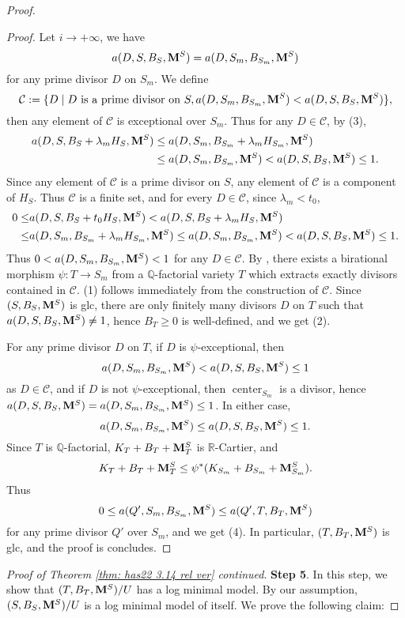 \documentclass[11pt]{amsart}
\numberwithin{equation}{section}
\newcommand{\Mm}{{\bf{M}}}
\newcommand{\Qq}{\mathbb{Q}}
\newcommand{\Rr}{\mathbb{R}}
\newcommand{\Center}{\operatorname{center}}
\theoremstyle{definition}
\theoremstyle{definition}
\theoremstyle{definition}
\begin{document}
\begin{proof}
\begin{proof}
Let $i\rightarrow+\infty$, we have
$$a(D,S,B_S,\Mm^S)=a(D,S_m,B_{S_m},\Mm^S)$$
for any prime divisor $D$ on $S_m$. We define
$$\mathcal{C}:=\{D\mid D\text{ is a prime divisor on }S, a(D,S_m,B_{S_m},\Mm^S)<a(D,S,B_S,\Mm^S)\},$$
then any element of $\mathcal{C}$ is exceptional over $S_m$. Thus for any $D\in\mathcal{C}$, by (3),
\begin{align*}
    a(D,S,B_S+\lambda_mH_S,\Mm^S)&\leq a(D,S_m,B_{S_m}+\lambda_mH_{S_m},\Mm^S)\\
    &\leq a(D,S_m,B_{S_m},\Mm^S)<a(D,S,B_S,\Mm^S)\leq 1.
\end{align*}
Since any element of $\mathcal{C}$ is a prime divisor on $S$, any element of $\mathcal{C}$ is a component of $H_S$. Thus $\mathcal{C}$ is a finite set, and for every $D\in\mathcal{C}$, since $\lambda_m<t_0$,
\begin{align*}
  0\leq &a(D,S,B_S+t_0H_S,\Mm^S)<a(D,S,B_S+\lambda_mH_S,\Mm^S)\\ \leq &a(D,S_m,B_{S_m}+\lambda_mH_{S_m},\Mm^S)\leq  a(D,S_m,B_{S_m},\Mm^S)<a(D,S,B_S,\Mm^S)\leq 1.  
\end{align*}
Thus $0<a(D,S_m,B_{S_m},\Mm^S)<1$ for any $D\in\mathcal{C}$. By \cite[Lemma 3.4]{Has22}, there exists a birational morphism $\psi: T\rightarrow S_m$ from a $\Qq$-factorial variety $T$ which extracts exactly divisors contained in $\mathcal{C}$. (1) follows immediately from the construction of $\mathcal{C}$. Since $(S,B_S,\Mm^S)$ is glc, there are only finitely many divisors $D$ on $T$ such that $a(D,S,B_S,\Mm^S)\not=1$, hence $B_T\geq 0$ is well-defined, and we get (2).

For any prime divisor $D$ on $T$, if $D$ is $\psi$-exceptional, then $$a(D,S_m,B_{S_m},\Mm^S)< a(D,S,B_S,\Mm^S)\leq 1$$ as $D\in\mathcal{C}$, and if $D$ is not $\psi$-exceptional, then $\Center_{S_m}$ is a divisor, hence $a(D,S,B_S,\Mm^S)=a(D,S_m,B_{S_m},\Mm^S)\leq 1$. In either case,
$$a(D,S_m,B_{S_m},\Mm^S)\leq a(D,S,B_S,\Mm^S)\leq 1.$$
Since $T$ is $\Qq$-factorial, $K_T+B_T+\Mm^S_T$ is $\Rr$-Cartier, and
$$K_T+B_T+\Mm^S_T\leq\psi^*(K_{S_m}+B_{S_m}+\Mm^S_{S_m}).$$
Thus
$$0\leq a(Q',S_m,B_{S_m},\Mm^S)\leq a(Q',T,B_T,\Mm^S)$$
for any prime divisor $Q'$ over $S_m$, and we get (4). In particular, $(T,B_T,\Mm^S)$ is glc, and the proof is concludes.
\end{proof}

\noindent\textit{Proof of Theorem \ref{thm: has22 3.14 rel ver} continued}. \noindent\textbf{Step 5}. In this step, we show that $(T,B_T,\Mm^S)/U$ has a log minimal model. By our assumption, $(S,B_S,\Mm^S)/U$ is a log minimal model of itself. We prove the following claim:


\end{proof}
\end{document}
